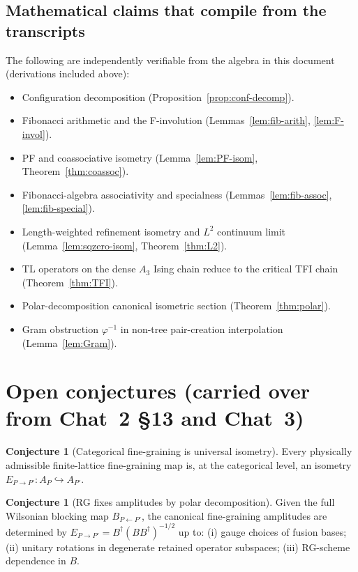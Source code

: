 \documentclass[11pt,a4paper]{article}
\theoremstyle{definition}
\newtheorem{conjecture}[definition]{Conjecture}
\begin{document}
\subsection{Mathematical claims that compile from the transcripts}

The following are independently verifiable from the algebra in this document
(derivations included above):
\begin{itemize}
\item Configuration decomposition (Proposition~\ref{prop:conf-decomp}).
\item Fibonacci arithmetic and the F-involution
      (Lemmas~\ref{lem:fib-arith}, \ref{lem:F-invol}).
\item PF and coassociative isometry (Lemma~\ref{lem:PF-isom},
      Theorem~\ref{thm:coassoc}).
\item Fibonacci-algebra associativity and specialness
      (Lemmas~\ref{lem:fib-assoc}, \ref{lem:fib-special}).
\item Length-weighted refinement isometry and $L^{2}$ continuum limit
      (Lemma~\ref{lem:sqzero-isom}, Theorem~\ref{thm:L2}).
\item TL operators on the dense $A_3$ Ising chain reduce to the critical
      TFI chain (Theorem~\ref{thm:TFI}).
\item Polar-decomposition canonical isometric section (Theorem~\ref{thm:polar}).
\item Gram obstruction $\varphi^{-1}$ in non-tree pair-creation
      interpolation (Lemma~\ref{lem:Gram}).
\end{itemize}

\section{Open conjectures (carried over from Chat~2 \S13 and Chat~3)}

\begin{conjecture}[Categorical fine-graining is universal isometry]
\label{conj:A}
Every physically admissible finite-lattice fine-graining map is, at the
categorical level, an isometry $E_{P\to P'}: A_P\hookrightarrow A_{P'}$.
\end{conjecture}

\begin{conjecture}[RG fixes amplitudes by polar decomposition]\label{conj:B}
Given the full Wilsonian blocking map $B_{P\leftarrow P'}$, the canonical
fine-graining amplitudes are determined by
$E_{P\to P'} = B^{\dagger}(BB^{\dagger})^{-1/2}$ up to: (i) gauge choices of
fusion bases; (ii) unitary rotations in degenerate retained operator
subspaces; (iii) RG-scheme dependence in $B$.
\end{conjecture}
\end{document}
